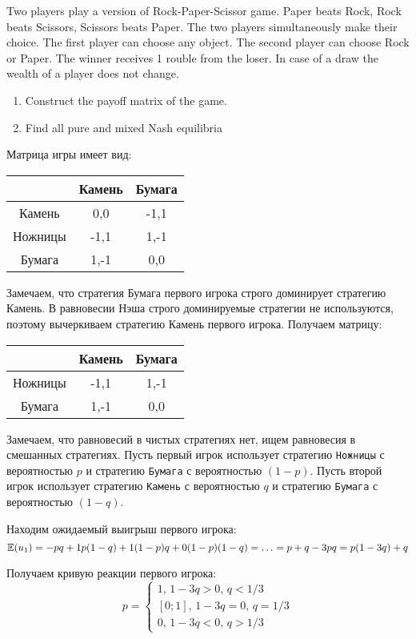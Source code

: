 \begin{problem}
Two players play a version of Rock-Paper-Scissor game. Paper beats Rock, Rock beats Scissors, Scissors beats Paper. The two players simultaneously make their choice. The first player can choose any object. The second player can choose Rock or Paper. The winner receives 1 rouble from the loser. In case of a draw the wealth of a player does not change.
\begin{enumerate}
\item Construct the payoff matrix of the game.
\item Find all pure and mixed Nash equilibria
\end{enumerate}
\end{problem}

\begin{solution}
Матрица игры имеет вид:

\begin{tabular}{c|cc}
 & Камень & Бумага \\ 
\hline 
Камень & 0,0 & -1,1 \\ 
Ножницы & -1,1 & 1,-1 \\ 
Бумага & 1,-1 & 0,0 \\ 
\end{tabular} 

Замечаем, что стратегия Бумага первого игрока строго доминирует стратегию Камень. В равновесии Нэша строго доминируемые стратегии не используются, поэтому вычеркиваем стратегию Камень первого игрока. Получаем матрицу:

\begin{tabular}{c|cc}
 & Камень & Бумага \\ 
\hline 
Ножницы & -1,1 & 1,-1 \\ 
Бумага & 1,-1 & 0,0 \\ 
\end{tabular} 

Замечаем, что равновесий в чистых стратегиях нет, ищем равновесия в смешанных стратегиях. Пусть первый игрок использует стратегию \verb|Ножницы| с вероятностью $p$ и стратегию \verb|Бумага| с вероятностью $(1-p)$. Пусть второй игрок использует стратегию \verb|Камень| с вероятностью $q$ и стратегию \verb|Бумага| с вероятностью $(1-q)$.

Находим ожидаемый выигрыш первого игрока:
\[
\mathbb{E}(u_1)=-pq+1p(1-q)+1(1-p)q+0(1-p)(1-q)=\ldots=p+q-3pq=p(1-3q)+q
\]

Получаем кривую реакции первого игрока:
\[
p=
\begin{cases}
1, \, 1-3q>0, \, q<1/3 \\
[0;1], \, 1-3q=0, \, q=1/3 \\
0, \, 1-3q<0, \, q>1/3
\end{cases}
\]



\end{solution}

